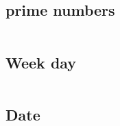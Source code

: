 \documentclass[a4paper, 10pt, twocolumn, landscape]{article}
\begin{document}
  \subsection{prime numbers}
  \inputminted{text}{misc/prime-numbers.txt}
  \subsection{Week day}
  \inputminted{cpp}{misc/week-day.cpp}
  \subsection{Date}
  \inputminted{cpp}{misc/date.cpp}

  \newpage
  \onecolumn
  \begin{table}[ht]
    \centering
\end{table}
\end{document}
